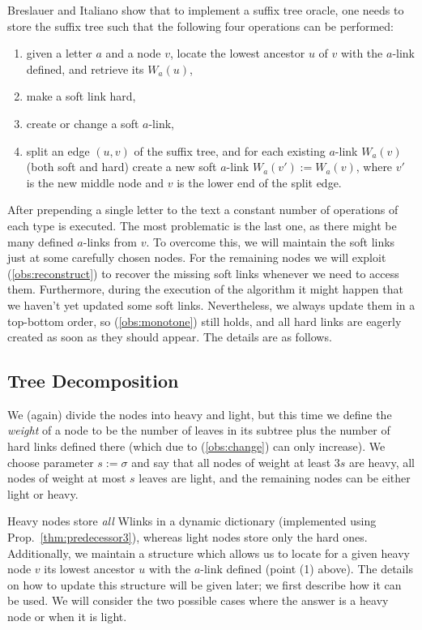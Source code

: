 \documentclass[11pt,onecolumn,final]{article} \usepackage{a4}
\theoremstyle{plain}
\theoremstyle{remark}
\begin{document}
Breslauer and Italiano show that to implement a suffix tree oracle, one needs to store the suffix tree such that the following four operations can be performed:

\begin{enumerate}
\item given a letter $a$ and a node $v$, locate the lowest ancestor $u$ of $v$ with the $a$-link defined, and retrieve its $W_a(u)$,
\item make a soft link hard,
\item create or change a soft $a$-link,
\item split an edge $(u,v)$ of the suffix tree, and for each existing $a$-link $W_a(v)$ (both soft and hard) create a new soft $a$-link $W_a(v'):=W_a(v)$, where $v'$ is the new middle node and $v$ is the lower end of the split edge.
\end{enumerate}

After prepending a single letter to the text a constant number of operations of each type is executed.
The most problematic is the last one, as
there might be many defined $a$-links from $v$. To overcome this, we will maintain the soft links just at some carefully chosen nodes. For the remaining nodes we will exploit (\ref{obs:reconstruct}) to recover the missing soft links whenever we need to access them. Furthermore, during the execution of the algorithm it might happen that we haven't yet updated some soft links. Nevertheless, we always update them in a top-bottom order, so (\ref{obs:monotone}) still holds, and all hard links are eagerly created as soon as they should appear. The details are as follows.

\subsection{Tree Decomposition}
We (again) divide the nodes into heavy and light, but this time we define the \emph{weight} of a node to be the number of leaves in its subtree plus the number of hard links defined there (which due to (\ref{obs:change}) can only increase). We choose parameter $s:=\sigma$ and say that all nodes of weight at least $3s$ are heavy, all nodes of weight at most $s$ leaves are light, and the remaining nodes can be either light or heavy.

Heavy nodes store \emph{all} Wlinks in a dynamic dictionary (implemented using Prop.~\ref{thm:predecessor3}), whereas light nodes store only the hard ones. Additionally, we maintain a structure which allows us to locate for a given heavy node $v$ its lowest ancestor $u$ with the $a$-link defined (point (1) above). The details on how to update this structure will be given later; we first describe how it can be used. We will consider the two possible cases where the answer is a heavy node or when it is light.
\end{document}
